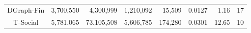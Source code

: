 \begin{table}[t]
{\begin{tabular}{c|rrrrrrr}
DGraph-Fin & 3,700,550                     & 4,300,999                     & 1,210,092                      & 15,509                           & 0.0127                               & 1.16                               & 17                            \\
T-Social   & 5,781,065                     & 73,105,508                    & 5,606,785                      & 174,280                          & 0.0301                               & 12.65                              & 10                           \\ \hline \hline
\end{tabular}
}\vspace{-4mm}
\end{table}
